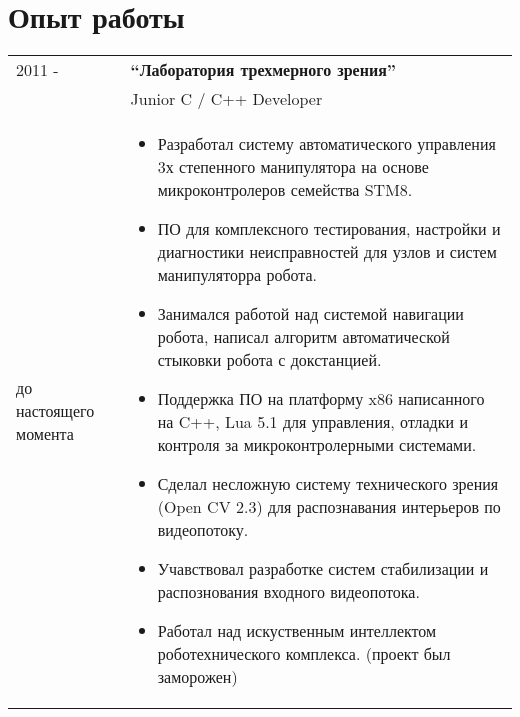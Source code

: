 \documentclass[a4paper, 11pt]{article}
\begin{document}


\section{Опыт работы }
\begin{tabular}{p{25mm}|p{110mm}}
2011 -& \textbf{``Лаборатория трехмерного зрения''} \\
& Junior C / C++ Developer \\
до настоящего момента &
\begin{itemize}
    \item Разработал систему автоматического управления 
    3х степенного манипулятора на основе микроконтролеров семейства STM8.
    \item ПО для комплексного тестирования, настройки и диагностики
    неисправностей для узлов и систем манипуляторра робота.
    \item Занимался работой над системой навигации робота,
    написал алгоритм автоматической стыковки робота с докстанцией.
    \item Поддержка ПО на платформу x86 написанного на C++, Lua 5.1 
    для управления, отладки и контроля за микроконтролерными системами.
    \item Сделал несложную систему технического зрения (Open CV 2.3) 
    для распознавания интерьеров по видеопотоку.
    \item Учавствовал разработке систем стабилизации и
    распознования входного видеопотока.
    \item Работал над искуственным интеллектом роботехнического комплекса.
    (проект был заморожен) 
\end{itemize}
\\
\end{tabular}
\end{document}
